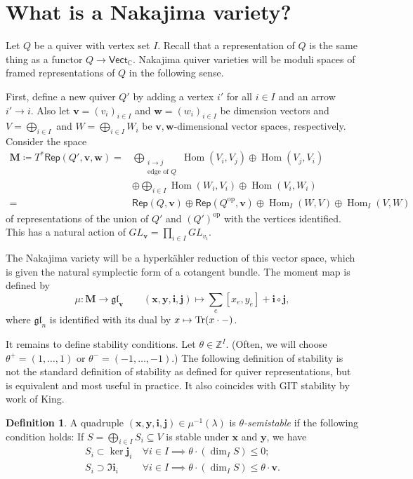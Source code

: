 \documentclass{amsart}
\theoremstyle{definition}
\newtheorem{defn}[thm]{Definition}
\theoremstyle{remark}
\theoremstyle{plain}
\theoremstyle{definition}
\theoremstyle{remark}
\newcommand{\C}{\mathbb{C}}
\newcommand{\Z}{\mathbb{Z}}
\newcommand{\mf}[1]{\mathfrak{#1}}
\newcommand{\mbf}[1]{\mathbf{#1}}
\newcommand{\mr}[1]{\mathrm{#1}}
\newcommand{\ms}[1]{\mathsf{#1}}
\newcommand{\ol}[1]{\overline{#1}}
\newcommand{\1}{\mathbf{1}}
\newcommand{\2}{\mathbf{2}}
\newcommand{\3}{\mathbf{3}}
\DeclareMathOperator{\Hom}{Hom}
\begin{document}
\section{What is a Nakajima variety?}

Let $Q$ be a quiver with vertex set $I$. Recall that a representation of $Q$ is the same thing as a functor $Q \to \ms{Vect}_{\C}$. Nakajima quiver varieties will be moduli spaces of framed representations of $Q$ in the following sense. 

First, define a new quiver $Q'$ by adding a vertex $i'$ for all $i \in I$ and an arrow $i' \to i$. Also let $\mathbf{v} = (v_i)_{i \in I}$ and $\mathbf{w} = (w_i)_{i \in I}$ be dimension vectors and $V = \bigoplus_{i \in I}$ and $W = \bigoplus_{i \in I} W_i$ be $\mathbf{v}, \mathbf{w}$-dimensional vector spaces, respectively. Consider the space
\begin{align*} 
    \mathbf{M} \coloneqq T^* \ms{Rep}(Q', \mathbf{v}, \mathbf{w}) ={} & \bigoplus_{\substack{i \to j \\ \text{edge of }Q}} \Hom(V_i, V_j) \oplus \Hom(V_j, V_i) \\
    &\oplus \bigoplus_{i \in I} \Hom(W_i, V_i) \oplus \Hom(V_i, W_i) \\
    ={} &\ms{Rep}(Q, \mathbf{v}) \oplus \ms{Rep}(Q^{\mr{op}}, \mathbf{v}) \oplus \Hom_I(W, V) \oplus \Hom_I(V, W)
\end{align*}
of representations of the union of $Q'$ and $(Q')^{\mr{op}}$ with the vertices identified. This has a natural action of $GL_{\mathbf{v}} = \prod_{i \in I} GL_{ v_i }$. 

The Nakajima variety will be a hyperk\"ahler reduction of this vector space, which is given the natural symplectic form of a cotangent bundle. The moment map is defined by
\[ \mu \colon \mathbf{M} \to \mf{gl}_{ \mathbf{v} } \qquad (\mathbf{x}, \mathbf{y}, \mathbf{i}, \mathbf{j}) \mapsto \sum_e [x_e, y_{\ol{e}}] + \mathbf{i} \circ \mathbf{j}, \]
where $\mf{gl}_n$ is identified with its dual by $x \mapsto \Trace(x \cdot -)$.

It remains to define stability conditions. Let $\theta \in \Z^I$. (Often, we will choose $\theta^+ = (1, \ldots, 1)$ or $\theta^- = (-1, \ldots, -1)$.) The following definition of stability is not the standard definition of stability as defined for quiver representations, but is equivalent and most useful in practice. It also coincides with GIT stability by work of King.
\begin{defn}
    A quadruple $(\mathbf{x}, \mbf{y}, \mbf{i}, \mbf{j}) \in \mu^{-1}(\lambda)$ is \textit{$\theta$-semistable} if the following condition holds: If $S = \bigoplus_{i \in I} S_i \subseteq V$ is stable under $\mbf{x}$ and $\mbf{y}$, we have
    \begin{align*}
        S_i \subset \ker \mbf{j}_i \ & \forall i \in I \implies \theta \cdot (\dim_I S) \leq 0; \\
        S_i \supset \Im \mbf{i}_i \ & \forall i \in I \implies \theta \cdot (\dim_I S) \leq \theta \cdot \mbf{v}.
    \end{align*}
\end{defn}
\end{document}
